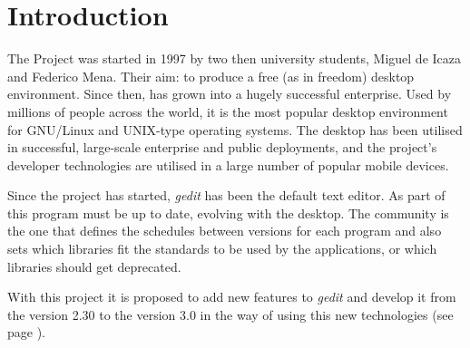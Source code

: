 
\chapter{Introduction}

The \GNOME Project was started in 1997 by two then university students, Miguel de Icaza and Federico Mena. Their aim: to produce a free (as in freedom) desktop environment. Since then, \GNOME has grown into a hugely successful enterprise. Used by millions of people across the world, it is the most popular desktop environment for GNU/Linux and UNIX-type operating systems. The desktop has been utilised in successful, large-scale enterprise and public deployments, and the project’s developer technologies are utilised in a large number of popular mobile devices\cite{website:gnome}.


Since the project has started, \emph{gedit} has been the default text editor. As part of \GNOME this program must be up to date, evolving with the desktop. The \GNOME community is the one that defines the schedules between versions for each program and also sets which libraries fit the standards to be used by the applications, or which libraries should get deprecated.

With this project it is proposed to add new features to \emph{gedit} and develop it from the version 2.30 to the version 3.0 in the way of using this new technologies (see page \pageref{chap:Technologies}).
